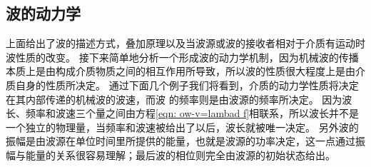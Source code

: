 \subsection{波的动力学}
上面给出了波的描述方式，叠加原理以及当波源或波的接收者相对于介质有运动时波性质的改变。
接下来简单地分析一个形成波的动力学机制，因为机械波的传播本质上是由构成介质物质之间的相互作用所导致，所以波的性质很大程度上是由介质自身的性质所决定。
通过下面几个例子我们将看到，介质的动力学性质将决定在其内部传递的机械波的波速，而波
的频率则是由波源的频率所决定。
因为波长、频率和波速三个量之间由方程\ref{eqn: ow-v=lambad f}相联系，所以波长并不是一个独立的物理量，当频率和波速被给出了以后，波长就被唯一决定。
另外波的振幅是由波源在单位时间里所提供的能量，也就是波源的功率决定，这一点通过振幅与能量的关系很容易理解；最后波的相位则完全由波源的初始状态给出。

